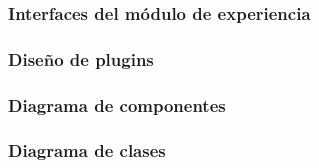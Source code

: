 




\subsubsection{Interfaces del módulo de experiencia}



\subsubsection{Diseño de plugins} %
\subsubsection{Diagrama de componentes} %
\subsubsection{Diagrama de clases} %

